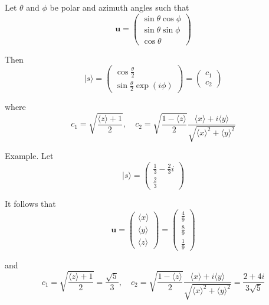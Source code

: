 Let $\theta$ and $\phi$ be polar and azimuth angles such that
\begin{equation*}
\mathbf u=\begin{pmatrix}\sin\theta\cos\phi\\\sin\theta\sin\phi\\\cos\theta\end{pmatrix}
\end{equation*}

Then
\begin{equation*}
|s\rangle=\begin{pmatrix}\cos\frac{\theta}{2}\\\sin\frac{\theta}{2}\exp(i\phi)\end{pmatrix}
=\begin{pmatrix}c_1\\c_2\end{pmatrix}
\end{equation*}

where
\begin{equation*}
c_1=\sqrt{\frac{\langle z\rangle+1}{2}},\quad
c_2=\sqrt{\frac{1-\langle z\rangle}{2}}
\frac{\langle x\rangle+i\langle y\rangle}{\sqrt{\langle x\rangle^2+\langle y\rangle^2}}
\end{equation*}

Example. Let
\begin{equation*}
|s\rangle=\begin{pmatrix}\frac{1}{3}-\frac{2}{3}i\\\frac{2}{3}\end{pmatrix}
\end{equation*}

It follows that
\begin{equation*}
\mathbf u
=\begin{pmatrix}\langle x\rangle\\[1ex]\langle y\rangle\\[1ex]\langle z\rangle\end{pmatrix}
=\begin{pmatrix}\frac{4}{9}\\[1ex]\frac{8}{9}\\[1ex]\frac{1}{9}\end{pmatrix}
\end{equation*}

and
\begin{equation*}
c_1=\sqrt{\frac{\langle z\rangle+1}{2}}=\frac{\sqrt5}{3},\quad
c_2=\sqrt{\frac{1-\langle z\rangle}{2}}
\frac{\langle x\rangle+i\langle y\rangle}{\sqrt{\langle x\rangle^2+\langle y\rangle^2}}
=\frac{2+4i}{3\sqrt5}
\end{equation*}


